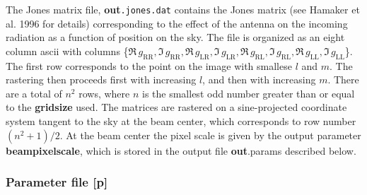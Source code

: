 \documentclass{article}
\begin{document}
The Jones matrix file, 
{\bf out}{\tt .jones.dat} contains the Jones matrix (see Hamaker et al. 1996 for
details) corresponding to the effect of the antenna on the incoming
radiation as a function of position on the sky.  The file is organized as
an eight column ascii with columns \{$
\Re \, g_\mathrm{RR}, \Im \, g_\mathrm{RR}, 
\Re \, g_\mathrm{LR}, \Im \, g_\mathrm{LR}, 
\Re \, g_\mathrm{RL}, \Im \, g_\mathrm{RL}, 
\Re \, g_\mathrm{LL}, \Im \, g_\mathrm{LL}$\}.  The first row corresponds
to the point on the image with smallese $l$ and $m$.  The rastering
then proceeds first with increasing $l$, and then with increasing $m$.  
There are a total of $n^2$ rows, where $n$ is the smallest odd number
greater than or equal to the {\bf gridsize} used.  The matrices are
rastered on a sine-projected coordinate system tangent to the sky at the
beam center, which corresponds to row number $(n^2+1)/2$.  At the beam center
the pixel scale is given by the output parameter {\bf beampixelscale}, which
is stored in the output file {\bf out}{.params} described below.

\subsubsection{Parameter file [{\bf p}]}
\end{document}
